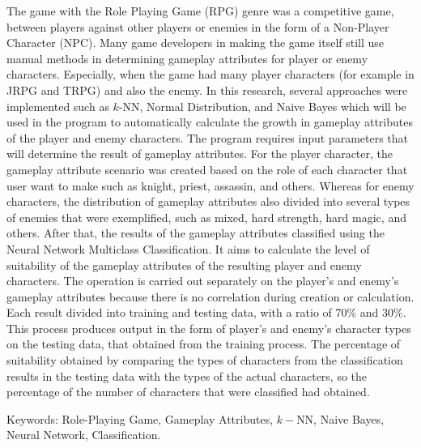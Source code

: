 \begin{spacing}{1}
	The game with the Role Playing Game (RPG) genre was a competitive game, between players against other players or enemies in the form of a Non-Player Character (NPC). Many game developers in making the game itself still use manual methods in determining gameplay attributes for player or enemy characters. Especially, when the game had many player characters (for example in JRPG and TRPG) and also the enemy. In this research, several approaches were implemented such as $k$-NN, Normal Distribution, and Naive Bayes which will be used in the program to automatically calculate the growth in gameplay attributes of the player and enemy characters. The program requires input parameters that will determine the result of gameplay attributes. For the player character, the gameplay attribute scenario was created based on the role of each character that user want to make such as knight, priest, assassin, and others. Whereas for enemy characters, the distribution of gameplay attributes also divided into several types of enemies that were exemplified, such as mixed, hard strength, hard magic, and others. After that, the results of the gameplay attributes classified using the Neural Network Multiclass Classification. It aims to calculate the level of suitability of the gameplay attributes of the resulting player and enemy characters. The operation is carried out separately on the player's and enemy's gameplay attributes because there is no correlation during creation or calculation. Each result divided into training and testing data, with a ratio of 70\% and 30\%. This process produces output in the form of player's and enemy's character types on the testing data, that obtained from the training process. The percentage of suitability obtained by comparing the types of characters from the classification results in the testing data with the types of the actual characters, so the percentage of the number of characters that were classified had obtained.
	\vspace{2ex}

	Keywords: Role-Playing Game, Gameplay Attributes, $k-$NN, Naive Bayes, Neural Network, Classification.
\end{spacing}